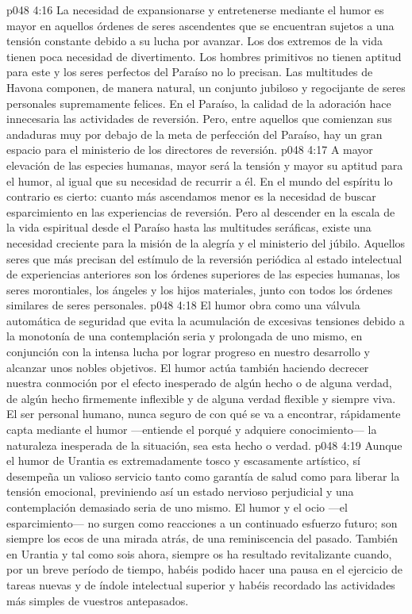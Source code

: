 \vs p048 4:16 \pc La necesidad de expansionarse y entretenerse mediante el humor es mayor en aquellos órdenes de seres ascendentes que se encuentran sujetos a una tensión constante debido a su lucha por avanzar. Los dos extremos de la vida tienen poca necesidad de divertimento. Los hombres primitivos no tienen aptitud para este y los seres perfectos del Paraíso no lo precisan. Las multitudes de Havona componen, de manera natural, un conjunto jubiloso y regocijante de seres personales supremamente felices. En el Paraíso, la calidad de la adoración hace innecesaria las actividades de reversión. Pero, entre aquellos que comienzan sus andaduras muy por debajo de la meta de perfección del Paraíso, hay un gran espacio para el ministerio de los directores de reversión.
\vs p048 4:17 A mayor elevación de las especies humanas, mayor será la tensión y mayor su aptitud para el humor, al igual que su necesidad de recurrir a él. En el mundo del espíritu lo contrario es cierto: cuanto más ascendamos menor es la necesidad de buscar esparcimiento en las experiencias de reversión. Pero al descender en la escala de la vida espiritual desde el Paraíso hasta las multitudes seráficas, existe una necesidad creciente para la misión de la alegría y el ministerio del júbilo. Aquellos seres que más precisan del estímulo de la reversión periódica al estado intelectual de experiencias anteriores son los órdenes superiores de las especies humanas, los seres morontiales, los ángeles y los hijos materiales, junto con todos los órdenes similares de seres personales.
\vs p048 4:18 El humor obra como una válvula automática de seguridad que evita la acumulación de excesivas tensiones debido a la monotonía de una contemplación seria y prolongada de uno mismo, en conjunción con la intensa lucha por lograr progreso en nuestro desarrollo y alcanzar unos nobles objetivos. El humor actúa también haciendo decrecer nuestra conmoción por el efecto inesperado de algún hecho o de alguna verdad, de algún hecho firmemente inflexible y de alguna verdad flexible y siempre viva. El ser personal humano, nunca seguro de con qué se va a encontrar, rápidamente capta mediante el humor ---entiende el porqué y adquiere conocimiento--- la naturaleza inesperada de la situación, sea esta hecho o verdad.
\vs p048 4:19 \pc Aunque el humor de Urantia es extremadamente tosco y escasamente artístico, sí desempeña un valioso servicio tanto como garantía de salud como para liberar la tensión emocional, previniendo así un estado nervioso perjudicial y una contemplación demasiado seria de uno mismo. El humor y el ocio ---el esparcimiento--- no surgen como reacciones a un continuado esfuerzo futuro; son siempre los ecos de una mirada atrás, de una reminiscencia del pasado. También en Urantia y tal como sois ahora, siempre os ha resultado revitalizante cuando, por un breve período de tiempo, habéis podido hacer una pausa en el ejercicio de tareas nuevas y de índole intelectual superior y habéis recordado las actividades más simples de vuestros antepasados.
